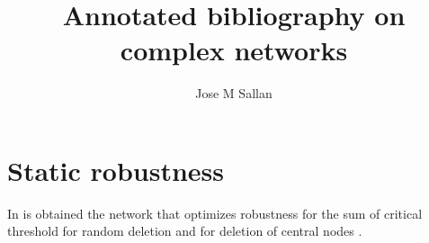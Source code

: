 \documentclass[12pt]{article}
\title{Annotated bibliography on complex networks}
\author{Jose M Sallan}
\date{}
\begin{document}
\maketitle

\section{Static robustness}

In \cite{Paul2005} is obtained the network that optimizes robustness for the sum of critical threshold for random deletion \cite{Cohen2000a} and for deletion of central nodes \cite{Cohen2001a}.

\nocite{*}



\end{document}
